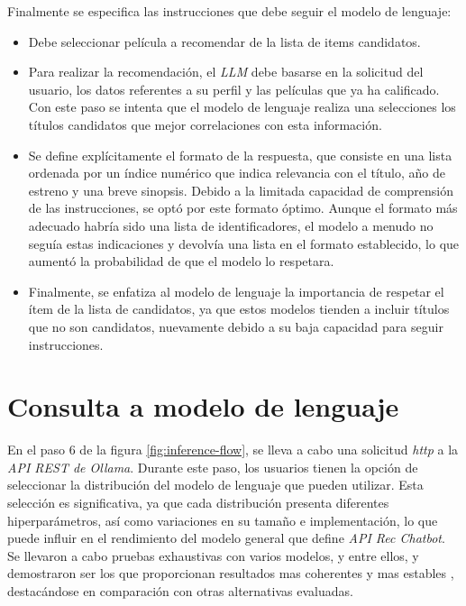 \documentclass[11pt,a4paper,twoside]{thesis}
\begin{document}
Finalmente se especifica las instrucciones que debe seguir el modelo de lenguaje:

\begin{itemize}
	\item Debe seleccionar película a recomendar de la lista de items candidatos.
	\item Para realizar la recomendación, el \textit{LLM} debe basarse en la solicitud del usuario, los datos referentes a su perfil y las películas que ya ha calificado. Con este paso se intenta que el modelo de lenguaje realiza una selecciones los títulos candidatos que mejor correlaciones con esta información.
	\item Se define explícitamente el formato de la respuesta, que consiste en una lista ordenada por un índice numérico que indica relevancia con el título, año de estreno y una breve sinopsis. Debido a la limitada capacidad de comprensión de las instrucciones, se optó por este formato óptimo. Aunque el formato más adecuado habría sido una lista de identificadores, el modelo a menudo no seguía estas indicaciones y devolvía una lista en el formato establecido, lo que aumentó la probabilidad de que el modelo lo respetara.
	\item Finalmente, se enfatiza al modelo de lenguaje la importancia de respetar el ítem de la lista de candidatos, ya que estos modelos tienden a incluir títulos que no son candidatos, nuevamente debido a su baja capacidad para seguir instrucciones.
\end{itemize}

\section{Consulta a modelo de lenguaje}

En el paso 6 de la figura \ref{fig:inference-flow}, se lleva a cabo una solicitud \textit{http} a la \textit{API REST de Ollama}. Durante este paso, los usuarios tienen la opción de seleccionar la distribución del modelo de lenguaje que pueden utilizar. Esta selección es significativa, ya que cada distribución presenta diferentes hiperparámetros, así como variaciones en su tamaño e implementación, lo que puede influir en el rendimiento del modelo general que define \textit{API Rec Chatbot}. Se llevaron a cabo pruebas exhaustivas con varios modelos, y entre ellos,  y  demostraron ser los que proporcionan resultados mas coherentes y mas estables , destacándose en comparación con otras alternativas evaluadas.
\end{document}
